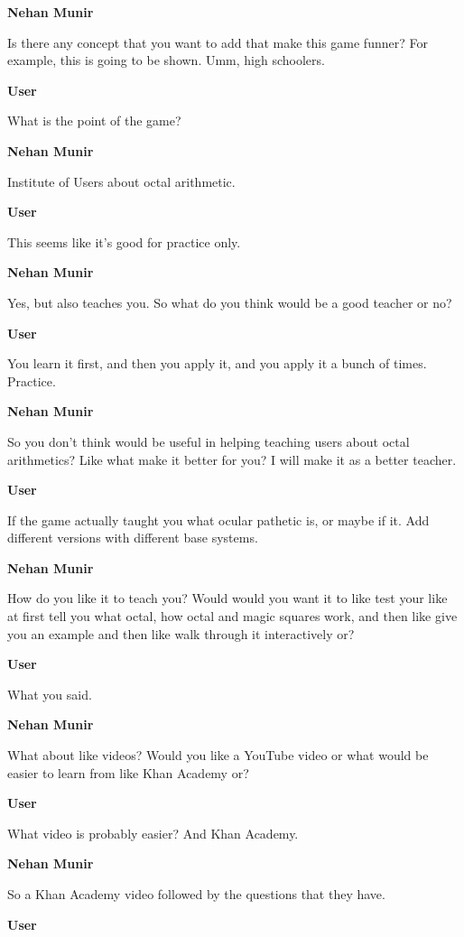 \documentclass{article}
\begin{document}
\noindent \textbf{Nehan Munir}

Is there any concept that you want to add that make this game funner? For example, this is going to be shown. Umm, high schoolers.

\noindent \textbf{User}

What is the point of the game?

\noindent \textbf{Nehan Munir}

Institute of Users about octal arithmetic.

\noindent \textbf{User}

This seems like it's good for practice only.

\noindent \textbf{Nehan Munir}

Yes, but also teaches you. So what do you think would be a good teacher or no?

\noindent \textbf{User}

You learn it first, and then you apply it, and you apply it a bunch of times. Practice.

\noindent \textbf{Nehan Munir}

So you don't think would be useful in helping teaching users about octal arithmetics? Like what make it better for you? I will make it as a better teacher.

\noindent \textbf{User}

If the game actually taught you what ocular pathetic is, or maybe if it. Add different versions with different base systems.

\noindent \textbf{Nehan Munir}

How do you like it to teach you? Would would you want it to like test your like at first tell you what octal, how octal and magic squares work, and then like give you an example and then like walk through it interactively or?

\noindent \textbf{User}

What you said.

\noindent \textbf{Nehan Munir}

What about like videos? Would you like a YouTube video or what would be easier to learn from like Khan Academy or?

\noindent \textbf{User}

What video is probably easier? And Khan Academy.

\noindent \textbf{Nehan Munir}

So a Khan Academy video followed by the questions that they have.

\noindent \textbf{User}
\end{document}
